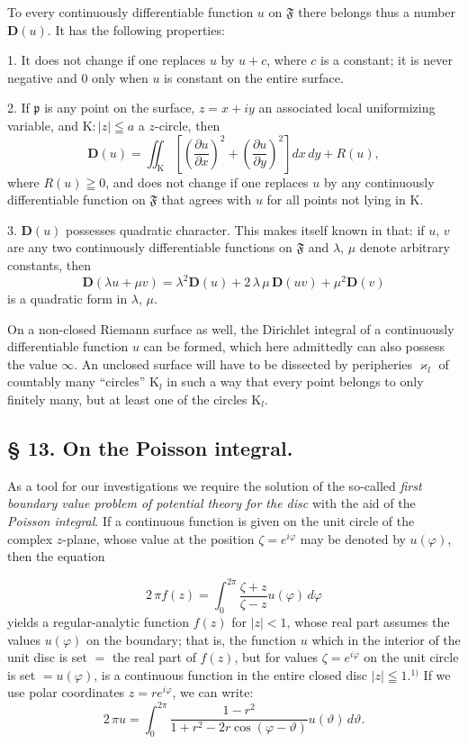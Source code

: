 \documentclass{article}
\begin{document}
To every continuously differentiable function $u$ on $\mathfrak{F}$ there belongs thus a number $\mathbf{D}(u)$. It has the following properties:

1. It does not change if one replaces $u$ by $u + c$, where $c$ is a constant; it is never negative and $0$ only when $u$ is constant on the entire surface.

2. If $\mathfrak{p}$ is any point on the surface, $z = x + iy$ an associated local uniformizing variable, and $\mathrm{K}\colon |z| \leqq a$ a $z$-circle, then
\[ \mathbf{D}(u) = \iint_{\mathrm{K}} \left[ \left(\frac{\partial u}{\partial x}\right)^2 + \left(\frac{\partial u}{\partial y}\right)^2 \right] dx\,dy + R(u), \]
where $R(u) \geqq 0$, and does not change if one replaces $u$ by any continuously differentiable function on $\mathfrak{F}$ that agrees with $u$ for all points not lying in $\mathrm{K}$.

3. $\mathbf{D}(u)$ possesses quadratic character. This makes itself known in that: if $u$, $v$ are any two continuously differentiable functions on $\mathfrak{F}$ and $\lambda$, $\mu$ denote arbitrary constants, then
\[ \mathbf{D}(\lambda u + \mu v) = \lambda^2 \mathbf{D}(u) + 2\,\lambda\,\mu\,\mathbf{D}(uv) + \mu^2 \mathbf{D}(v) \]
is a quadratic form in $\lambda$, $\mu$.

On a non-closed Riemann surface as well, the Dirichlet integral of a continuously differentiable function $u$ can be formed, which here admittedly can also possess the value $\infty$. An unclosed surface will have to be dissected by peripheries $\varkappa_l$ of countably many ``circles'' $\mathrm{K}_l$ in such a way that every point belongs to only finitely many, but at least one of the circles $\mathrm{K}_l$.

\subsection*{§ 13. On the Poisson integral.}

As a tool for our investigations we require the solution of the so-called \emph{first boundary value problem of potential theory for the disc} with the aid of the \emph{Poisson integral}. If a continuous function is given on the unit circle of the complex $z$-plane, whose value at the position $\zeta = e^{i\varphi}$ may be denoted by $u(\varphi)$, then the equation

\[ 2\,\pi f(z) = \int_0^{2\pi} \frac{\zeta + z}{\zeta - z} u(\varphi)\,d\varphi \]
yields a regular-analytic function $f(z)$ for $|z| < 1$, whose real part assumes the values $u(\varphi)$ on the boundary; that is, the function $u$ which in the interior of the unit disc is set $=$ the real part of $f(z)$, but for values $\zeta = e^{i\varphi}$ on the unit circle is set $= u(\varphi)$, is a continuous function in the entire closed disc $|z| \leqq 1$.${}^{1)}$ If we use polar coordinates $z = r e^{i\varphi}$, we can write:
\[ 2\,\pi u = \int_0^{2\pi} \frac{1 - r^2}{1 + r^2 - 2r \cos(\varphi - \vartheta)} u(\vartheta)\,d\vartheta. \tag{15} \]
\end{document}
